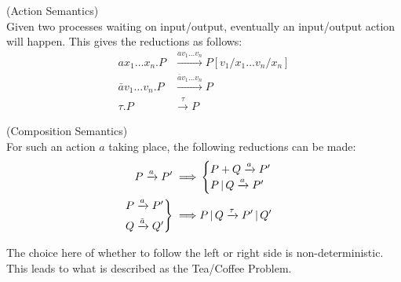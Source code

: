    \begin{definition}{(Action Semantics)\\}
        Given two processes waiting on input/output, eventually an input/output action will happen.
        This gives the reductions as follows:
        \begin{align}
            a x_1 \ldots x_n . P        & \xrightarrow{a v_1 \ldots v_n} P[v_1 / x_1 \ldots v_n / x_n] \\
            \bar{a} v_1 \ldots v_n . P  & \xrightarrow{\bar{a} v_1 \ldots v_n} P \\
            \tau . P                    & \xrightarrow{\tau} P
        \end{align}
    \end{definition}


    \begin{definition}{(Composition Semantics)\\}
        For such an action $a$ taking place, the following reductions can be made:
        \begin{align}
            P \xrightarrow{a} P' \implies &
            \begin{cases}
                P + Q \xrightarrow{a} P' \\
                P \, | \, Q \xrightarrow{a} P' \\
            \end{cases} \\
            \begin{rcases}
                P \xrightarrow{a} P' \\
                Q \xrightarrow{\bar{a}} Q' \\
            \end{rcases} \implies &
            P \, | \, Q \xrightarrow{\tau} P' \, | \, Q'
        \end{align}
    \end{definition}
    The choice here of whether to follow the left or right side is non-deterministic.
    This leads to what is described as the Tea/Coffee Problem.



